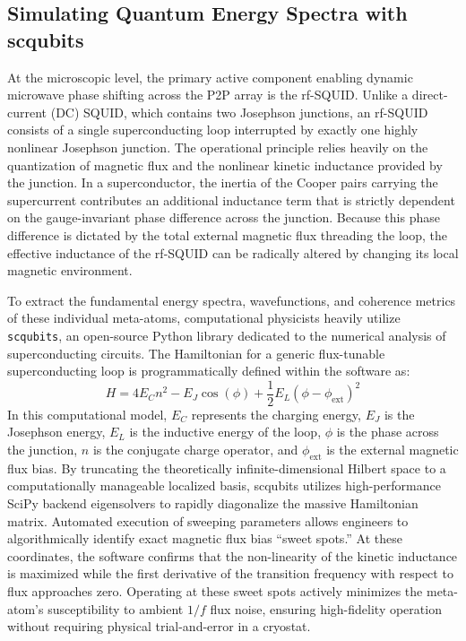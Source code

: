 \documentclass[11pt,a4paper]{article}
\begin{document}
\subsection{Simulating Quantum Energy Spectra with scqubits}

At the microscopic level, the primary active component enabling dynamic microwave phase shifting across the P2P array is the rf-SQUID.\cite{ref6} Unlike a direct-current (DC) SQUID, which contains two Josephson junctions, an rf-SQUID consists of a single superconducting loop interrupted by exactly one highly nonlinear Josephson junction.\cite{ref6} The operational principle relies heavily on the quantization of magnetic flux and the nonlinear kinetic inductance provided by the junction.\cite{ref6} In a superconductor, the inertia of the Cooper pairs carrying the supercurrent contributes an additional inductance term that is strictly dependent on the gauge-invariant phase difference across the junction.\cite{ref6} Because this phase difference is dictated by the total external magnetic flux threading the loop, the effective inductance of the rf-SQUID can be radically altered by changing its local magnetic environment.\cite{ref6}

To extract the fundamental energy spectra, wavefunctions, and coherence metrics of these individual meta-atoms, computational physicists heavily utilize \texttt{scqubits}, an open-source Python library dedicated to the numerical analysis of superconducting circuits.\cite{ref6} The Hamiltonian for a generic flux-tunable superconducting loop is programmatically defined within the software as:
\begin{equation}
H = 4E_C n^2 - E_J \cos(\phi) + \frac{1}{2} E_L(\phi - \phi_{\text{ext}})^2
\end{equation}
In this computational model, $E_C$ represents the charging energy, $E_J$ is the Josephson energy, $E_L$ is the inductive energy of the loop, $\phi$ is the phase across the junction, $n$ is the conjugate charge operator, and $\phi_{\text{ext}}$ is the external magnetic flux bias.\cite{ref6} By truncating the theoretically infinite-dimensional Hilbert space to a computationally manageable localized basis, scqubits utilizes high-performance SciPy backend eigensolvers to rapidly diagonalize the massive Hamiltonian matrix.\cite{ref6} Automated execution of sweeping parameters allows engineers to algorithmically identify exact magnetic flux bias ``sweet spots.'' At these coordinates, the software confirms that the non-linearity of the kinetic inductance is maximized while the first derivative of the transition frequency with respect to flux approaches zero.\cite{ref6} Operating at these sweet spots actively minimizes the meta-atom's susceptibility to ambient $1/f$ flux noise, ensuring high-fidelity operation without requiring physical trial-and-error in a cryostat.\cite{ref6}
\end{document}
